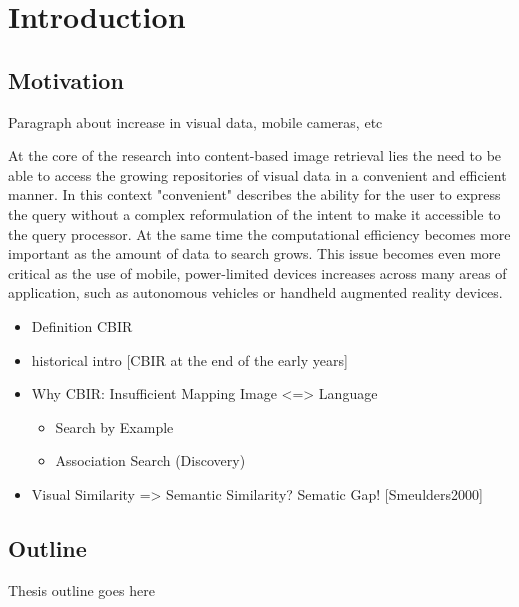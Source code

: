 \chapter{Introduction}\label{ch:introduction}

\section{Motivation}

Paragraph about increase in visual data, mobile cameras, etc

At the core of the research into content-based image retrieval lies the need to
be able to access the growing repositories of visual data in a convenient and
efficient manner.  In this context "convenient" describes the ability for the
user to express the query without a complex reformulation of the intent to make
it accessible to the query processor. At the same time the computational
efficiency becomes more important as the amount of data to search grows. This
issue becomes even more critical as the use of mobile, power-limited devices
increases across many areas of application, such as autonomous vehicles or
handheld augmented reality devices.

\begin{itemize}
    \item Definition CBIR
    \item historical intro [CBIR at the end of the early years]
    \item Why CBIR: Insufficient Mapping Image <=> Language
        \begin{itemize}
            \item Search by Example
            \item Association Search (Discovery)
        \end{itemize}
    \item Visual Similarity => Semantic Similarity? Sematic Gap! [Smeulders2000]
\end{itemize}


\section{Outline}

Thesis outline goes here
